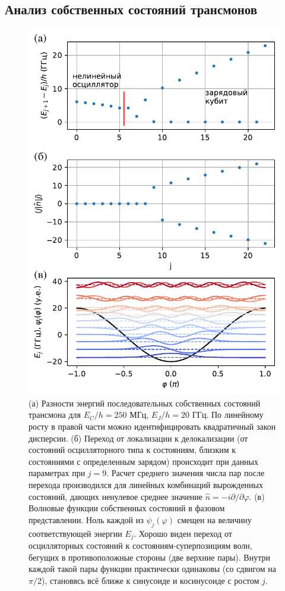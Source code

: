 \documentclass[14pt, a4paper]{extreport}
\numberwithin{equation}{section}
\begin{document}
\subsection{Анализ собственных состояний трансмонов}




\begin{figure}
	\centering
	\includegraphics[width=0.6\linewidth]{Pictures/transmon_levels}
	\caption{(а) Разности энергий последовательных собственных состояний трансмона для $E_C/h = 250$ МГц, $E_J/h = 20$ ГГц. По линейному росту в правой части можно идентифицировать квадратичный закон дисперсии. (б) Переход от локализации к делокализации (от состояний осцилляторного типа к состояниям, близким к состояниями с определенным зарядом) происходит при данных параметрах при $j=9$. Расчет среднего значения числа пар после перехода производился для линейных комбинаций вырожденных состояний, дающих ненулевое среднее значение $\hat n = -i \partial/\partial \varphi$. (в) Волновые функции собственных состояний в фазовом представлении. Ноль каждой из $\psi_j(\varphi)$ смещен на величину соответствующей энергии $E_j$. Хорошо виден переход от осцилляторных состояний к состояниям-суперпозициям волн, бегущих в противоположные стороны (две верхние пары). Внутри каждой такой пары функции практически одинаковы (со сдвигом на $\pi/2$), становясь всё ближе к синусоиде и косинусоиде с ростом $j$.}
	\label{fig:transmonlevels}
\end{figure}
\end{document}
